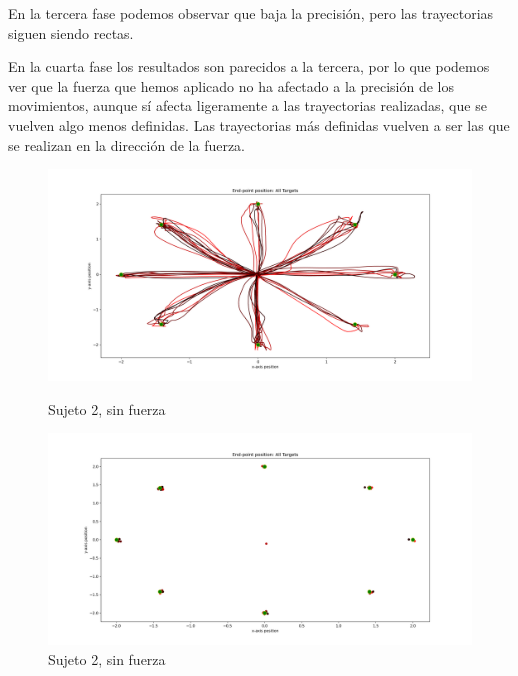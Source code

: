 \documentclass[a4paper,11pt, oneside]{book}
\begin{document}
En la tercera fase podemos observar que baja la precisión, pero las trayectorias siguen siendo rectas. 

En la cuarta fase los resultados son parecidos a la tercera, por lo que podemos ver que la fuerza que hemos aplicado no ha afectado a la precisión de los movimientos, aunque sí afecta ligeramente a las trayectorias realizadas, que se vuelven algo menos definidas. Las trayectorias más definidas vuelven a ser las que se realizan en la dirección de la fuerza.

\begin{figure}[H]
	\begin{minipage}[b]{0.5\linewidth}
		\centering
		\includegraphics[width=\linewidth]{sujeto2/no_force/trayectorias}
		\caption{Sujeto 2, sin fuerza}
		\label{fig:figura1}
	\end{minipage}
	\hspace{0.5cm}
	\begin{minipage}[b]{0.5\linewidth}
		\centering
		\includegraphics[width=\linewidth]{sujeto2/no_force/trayectorias_puntos}
		\caption{Sujeto 2, sin fuerza}
		\label{fig:figura2}
	\end{minipage}
\end{figure}
\end{document}
